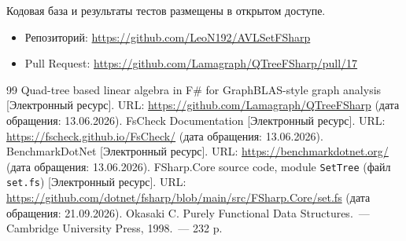 \documentclass[a4paper,12pt]{article}
\begin{document}
Кодовая база и результаты тестов размещены в открытом доступе.
\begin{itemize}
    \item Репозиторий: \url{https://github.com/LeoN192/AVLSetFSharp}
    \item Pull Request: \url{https://github.com/Lamagraph/QTreeFSharp/pull/17}
\end{itemize}

\renewcommand{\refname}{Литература}
\begin{thebibliography}{99}
     Quad-tree based linear algebra in F\# for GraphBLAS-style graph analysis [Электронный ресурс]. URL: \url{https://github.com/Lamagraph/QTreeFSharp} (дата обращения: 13.06.2026).
     FsCheck Documentation [Электронный ресурс]. URL: \url{https://fscheck.github.io/FsCheck/} (дата обращения: 13.06.2026).
     BenchmarkDotNet [Электронный ресурс]. URL: \url{https://benchmarkdotnet.org/} (дата обращения: 13.06.2026).
     FSharp.Core source code, module \texttt{SetTree} (файл \texttt{set.fs}) [Электронный ресурс]. URL: \url{https://github.com/dotnet/fsharp/blob/main/src/FSharp.Core/set.fs} (дата обращения: 21.09.2026).
     Okasaki C. Purely Functional Data Structures.~--- Cambridge University Press, 1998.~--- 232 p.
\end{thebibliography}
\end{document}
